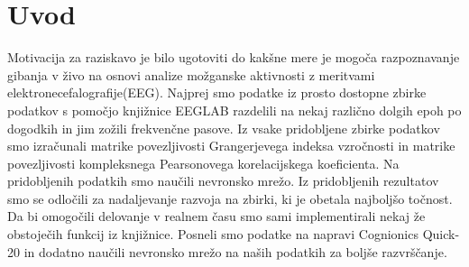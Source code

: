 \chapter{Uvod}
\thispagestyle{fancy}
Motivacija za raziskavo je bilo ugotoviti do kakšne mere je mogoča razpoznavanje gibanja v živo na osnovi analize možganske aktivnosti z meritvami elektronecefalografije(EEG). Najprej smo podatke iz prosto dostopne zbirke podatkov s pomočjo knjižnice EEGLAB razdelili na nekaj različno dolgih epoh po dogodkih in jim zožili frekvenčne pasove. Iz vsake pridobljene zbirke podatkov smo izračunali matrike povezljivosti Grangerjevega indeksa vzročnosti in matrike povezljivosti kompleksnega Pearsonovega korelacijskega koeficienta. Na pridobljenih podatkih smo naučili nevronsko mrežo. Iz pridobljenih rezultatov smo se odločili za nadaljevanje razvoja na zbirki, ki je obetala najboljšo točnost. Da bi omogočili delovanje v realnem času smo sami implementirali nekaj že obstoječih funkcij iz knjižnice. Posneli smo podatke na napravi Cognionics Quick-20 in dodatno naučili nevronsko mrežo na naših podatkih za boljše razvrščanje.
\newpage
